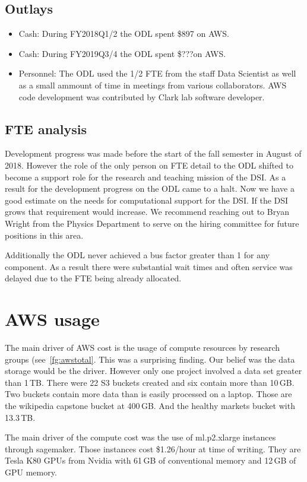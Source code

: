 \subsection{Outlays}
\begin{itemize}
\item Cash: During FY2018Q1/2 the ODL spent \$897 on AWS.
\item Cash: During FY2019Q3/4 the ODL spent \$???on AWS.
\item Personnel: The ODL used the 1/2 FTE from the staff Data Scientist as well as a small ammount of time in meetings from various collaborators. AWS code development was contributed by Clark lab software developer.
\end{itemize}


\subsection{FTE analysis}
Development progress was made before the start of the fall semester in August of 2018. However the role of the only person on FTE detail to the ODL shifted to become a support role for the research and teaching mission of the DSI. As a result for the development progress on the ODL came to a halt. Now we have a good estimate on the needs for computational support for the DSI. If the DSI grows that requirement would increase. We recommend reaching out to Bryan Wright from the Physics Department to serve on the hiring committee for future positions in this area.

Additionally the ODL never achieved a bus factor greater than 1 for any component. As a result there were substantial wait times and often service was delayed due to the FTE being already allocated.

\section{AWS usage}
The main driver of AWS cost is the usage of compute resources by research groups (see~\ref{fg:awstotal}. This was a surprising finding. Our belief was the data storage would be the driver. However only one project involved a data set greater than 1\,TB.
There were 22 S3 buckets created and six contain more than 10\,GB. Two buckets contain more data than is easily processed on a laptop. Those are the wikipedia capstone bucket at 400\,GB. And the healthy markets bucket with 13.3\,TB.

The main driver of the compute cost was the use of ml.p2.xlarge instances through sagemaker. Those instances cost \$1.26/hour at time of writing. They are Tesla K80 GPUs from Nvidia with 61\,GB of conventional memory and 12\,GB of GPU memory.

